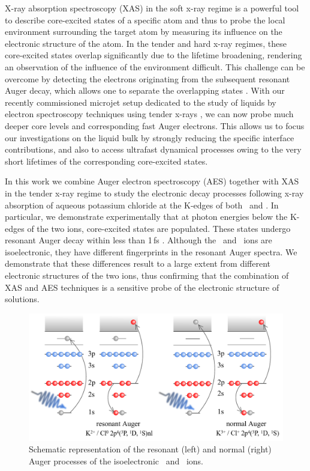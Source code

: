 X-ray absorption spectroscopy (XAS) in the soft x-ray regime is a powerful tool to describe core-excited states of a specific atom and thus to probe the local environment surrounding the target atom by measuring its influence on the electronic structure of the atom. In the tender and hard x-ray regimes, these core-excited states overlap significantly due to the lifetime broadening, rendering an observation of the influence of the environment difficult. This challenge can be overcome by detecting the electrons originating from the subsequent resonant Auger decay, which allows one to separate the overlapping states \citep{foehlisch05:373,goldsz16:15133}. With our recently commissioned microjet setup dedicated to the study of liquids by electron spectroscopy techniques using tender x-rays \citep{ceolin13:188,rueff15:175}, we can now probe much deeper core levels and corresponding fast Auger electrons. This allows us to focus our investigations on the liquid bulk by strongly reducing the specific interface contributions, and also to access ultrafast dynamical processes
owing to the very short lifetimes of the corresponding core-excited states.


In this work we combine Auger electron spectroscopy (AES) together with XAS in the tender x-ray regime to study the electronic decay processes following x-ray absorption of aqueous potassium chloride at the K-edges of both \ki~and \cli. In particular, we demonstrate experimentally that at photon energies below the K-edges of the two ions, core-excited states are populated. These states undergo resonant Auger decay within less than 1\,fs \citep{ceolin17:263003}. Although the \ki~and \cli~ions are isoelectronic, they have different fingerprints in the resonant Auger spectra. We demonstrate that these differences result to a large extent from different electronic structures of the two ions, thus confirming that the combination of XAS and AES techniques is a sensitive probe of the electronic structure of solutions.


\begin{figure}
\includegraphics[scale=0.7]{figures/auger_process.pdf}
\caption{Schematic representation of the resonant (left) and normal (right) Auger
processes of the isoelectronic \ki~and \cli~ions.}
\label{fg:auger}
\end{figure}

